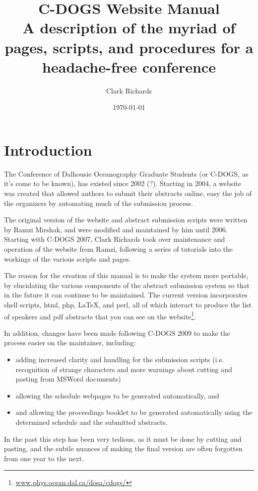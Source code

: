 \documentclass[letterpaper,12pt]{article}
\title{C-DOGS Website Manual \\ A description of the myriad of pages,
  scripts, and procedures for a headache-free conference}
\author{Clark Richards}
\date{\today}
\begin{document}
\maketitle
\newpage

\tableofcontents
\newpage

\section{Introduction}

The Conference of Dalhousie Oceanography Graduate Students (or C-DOGS,
as it's come to be known), has existed since 2002 (?). Starting in
2004, a website was created that allowed authors to submit their
abstracts online, easy the job of the organizers by automating much of
the submission process.

The original version of the website and abstract submission scripts
were written by Ramzi Mirshak, and were modified and maintained by him
until 2006. Starting with C-DOGS 2007, Clark Richards took over
maintenance and operation of the website from Ramzi, following a
series of tutorials into the workings of the various scripts and
pages.

The reason for the creation of this manual is to make the system more
portable, by elucidating the various components of the abstract
submission system so that in the future it can continue to be
maintained. The current version incorporates shell scripts, html, php,
\LaTeX, and perl, all of which interact to produce the list of
speakers and pdf abstracts that you can see on the
website\footnote{\url{www.phys.ocean.dal.ca/dosa/cdogs/}}.

In addition, changes have been made following C-DOGS 2009 to make the
process easier on the maintainer, including:
\begin{itemize}
\item adding increased clarity and handling for the submission scripts
  (i.e. recognition of strange characters and more warnings about
  cutting and pasting from MSWord documents)
\item allowing the schedule webpages to be generated automatically, and
\item and allowing the proceedings booklet to be generated
  automatically using the determined schedule and the submitted
  abstracts.
\end{itemize}
In the past this step has been very tedious, as it must be done by
cutting and pasting, and the subtle nuances of making the final
version are often forgotten from one year to the next.
\end{document}
